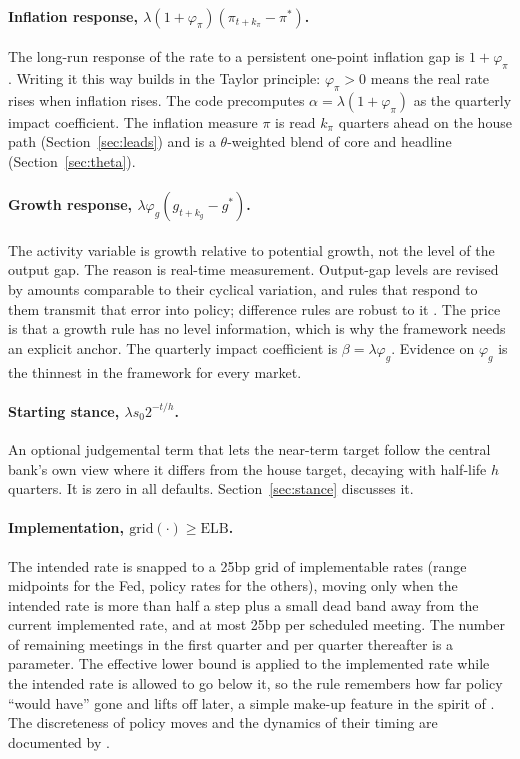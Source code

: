 \documentclass[11pt,a4paper]{article}
\newcommand{\pis}{\pi^{*}}
\newcommand{\gs}{g^{*}}
\newcommand{\ELB}{\mathrm{ELB}}
\begin{document}
\paragraph{Inflation response, $\lambda(1+\varphi_\pi)(\pi_{t+k_\pi}-\pis)$.}
The long-run response of the rate to a persistent one-point inflation gap is $1+\varphi_\pi$. Writing it this way builds in the Taylor principle: $\varphi_\pi > 0$ means the real rate rises when inflation rises. The code precomputes $\alpha = \lambda(1+\varphi_\pi)$ as the quarterly impact coefficient. The inflation measure $\pi$ is read $k_\pi$ quarters ahead on the house path (Section~\ref{sec:leads}) and is a $\theta$-weighted blend of core and headline (Section~\ref{sec:theta}).

\paragraph{Growth response, $\lambda\varphi_g(g_{t+k_g}-\gs)$.}
The activity variable is growth relative to potential growth, not the level of the output gap. The reason is real-time measurement. Output-gap levels are revised by amounts comparable to their cyclical variation, and rules that respond to them transmit that error into policy; difference rules are robust to it \parencite{orphanides2001,orphanideswilliams2002,walsh2003}. The price is that a growth rule has no level information, which is why the framework needs an explicit anchor. The quarterly impact coefficient is $\beta = \lambda\varphi_g$. Evidence on $\varphi_g$ is the thinnest in the framework for every market.

\paragraph{Starting stance, $\lambda s_0 2^{-t/h}$.}
An optional judgemental term that lets the near-term target follow the central bank's own view where it differs from the house target, decaying with half-life $h$ quarters. It is zero in all defaults. Section~\ref{sec:stance} discusses it.

\paragraph{Implementation, $\mathrm{grid}(\cdot)\ge\ELB$.}
The intended rate is snapped to a 25bp grid of implementable rates (range midpoints for the Fed, policy rates for the others), moving only when the intended rate is more than half a step plus a small dead band away from the current implemented rate, and at most 25bp per scheduled meeting. The number of remaining meetings in the first quarter and per quarter thereafter is a parameter. The effective lower bound is applied to the implemented rate while the intended rate is allowed to go below it, so the rule remembers how far policy ``would have'' gone and lifts off later, a simple make-up feature in the spirit of \textcite{reifschneider2000}. The discreteness of policy moves and the dynamics of their timing are documented by \textcite{hamiltonjorda2002}.
\end{document}

